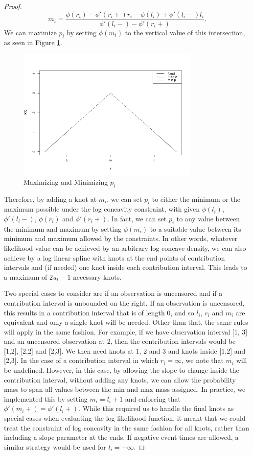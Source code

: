\begin{proof}
	\[ m_i = \frac{\phi(r_i) - \phi'(r_i + ) r_i - \phi(l_i) + \phi'(l_i - ) l_i} { \phi'(l_i - ) - \phi'(r_i + )}.
	\]		
	 We can maximize $p_i$ by setting $\phi(m_i)$ to the vertical value of this intersection, as seen in Figure \ref{figure:MaxMin}. 

	\begin{figure}[h]
\centerline{\includegraphics[width = 9cm]{maxminpk.pdf}}
\caption{Maximizing and Minimizing $p_i$}
\label{figure:MaxMin}
\end{figure}		

	Therefore, by adding a knot at $m_i$, we can set $p_i$ to either the minimum or the maximum possible under the log concavity constraint, with given $\phi(l_i)$, $\phi'(l_i -)$, $\phi(r_i)$ and $\phi'(r_i+)$. In fact, we can set $p_i$ to any value between the minimum and maximum by setting $\phi(m_i)$ to a suitable value between its minimum and maximum allowed by the constraints.  In other words, whatever likelihood value can be achieved by an arbitrary log-concave density, we can also achieve by a log linear spline with knots at the end points of contribution intervals and (if needed) one knot inside each contribution interval. This leads to a maximum of $2u_t-1$ necessary knots.
	
	Two special cases to consider are if an observation is uncensored and if a contribution interval is unbounded on the right. If an observation is uncensored, this results in a contribution interval that is of length 0, and so $l_i$, $r_i$ and $m_i$ are equivalent and only a single knot will be needed. Other than that, the same rules will apply in the same fashion. For example, if we have observation interval [1, 3] and an uncensored observation at 2, then the contribution intervals would be [1,2], [2,2] and [2,3]. We then need knots at 1, 2 and 3 and knots inside [1,2] and [2,3]. In the case of a contribution interval in which $r_i = \infty$, we note that $m_i$ will be undefined. However, in this case, by allowing the slope to change inside the contribution interval, without adding any knots, we can allow the probability mass to span all values between the min and max mass assigned. In practice, we implemented this by setting $m_i = l_i + 1$ and enforcing that $\phi'(m_i+) = \phi'(l_i+)$. While this required us to handle the final knots as special cases when evaluating the log likelihood function, it meant that we could treat the constraint of log concavity in the same fashion for all knots, rather than including a slope parameter at the ends. If negative event times are allowed, a similar strategy would be used for $l_i = -\infty$. 
	

\end{proof}
